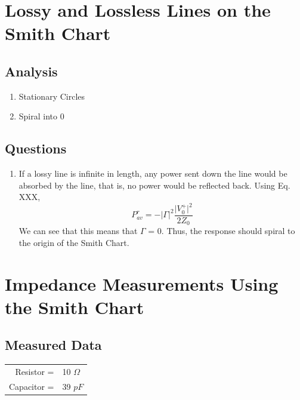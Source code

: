 \documentclass{article}
\begin{document}
\section{Lossy and Lossless Lines on the Smith Chart}
\subsection{Analysis}
\begin{enumerate}
	\item Stationary Circles
	\item Spiral into 0
\end{enumerate}
\subsection{Questions}
\begin{enumerate}
	\item If a lossy line is infinite in length, any power sent down the line would be absorbed by the line, that is, no power would be reflected back. Using Eq. XXX, 
	\begin{equation}
		P_{av}^r = -\vert\Gamma\vert^2 \frac{\vert V_0^+\vert^2}{2Z_0}
	\end{equation}
We can see that this means that $\Gamma$ = 0. Thus, the response should spiral to the origin of the Smith Chart.
\end{enumerate}
\section{Impedance Measurements Using the Smith Chart}
\subsection{Measured Data}
\begin{table}[H]
\centering
	\begin{tabular}{rl}
	Resistor =   & 10 $\Omega$  \\
	Capacitor =  & 39 $pF$      
	\end{tabular}
\end{table}
\end{document}
